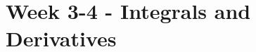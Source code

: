 \documentclass[../main.tex]{subfiles}
\begin{document}
\section{Week 3-4 - Integrals and Derivatives}

\printbibliography[heading=subbibliography]
\end{document}
